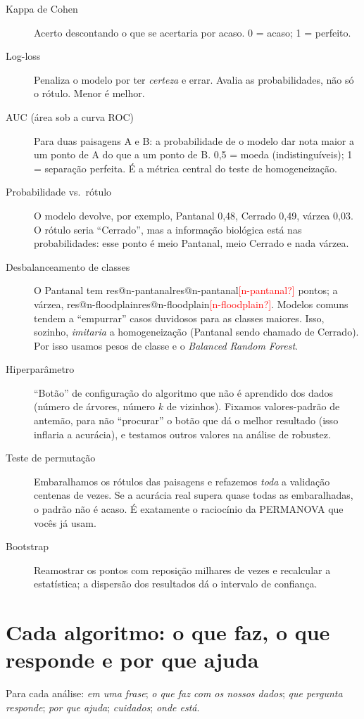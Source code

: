 \documentclass[11pt,a4paper]{article}
\makeatletter
\newcommand{\res}[1]{\ifcsname res@#1\endcsname\csname res@#1\endcsname\else\textcolor{red}{[#1?]}\fi}
\makeatother
\begin{document}
\begin{description}
\item[Kappa de Cohen] Acerto descontando o que se acertaria por acaso. 0 = acaso; 1 = perfeito.

\item[Log-loss] Penaliza o modelo por ter \emph{certeza} e errar. Avalia as probabilidades, não só o
rótulo. Menor é melhor.

\item[AUC (área sob a curva ROC)] Para duas paisagens A e B: a probabilidade de o modelo dar nota
maior a um ponto de A do que a um ponto de B. 0,5 = moeda (indistinguíveis); 1 = separação perfeita.
É a métrica central do teste de homogeneização.

\item[Probabilidade vs.\ rótulo] O modelo devolve, por exemplo, Pantanal 0,48, Cerrado 0,49,
várzea 0,03. O rótulo seria ``Cerrado'', mas a informação biológica está nas probabilidades: esse
ponto é meio Pantanal, meio Cerrado e nada várzea.

\item[Desbalanceamento de classes] O Pantanal tem \res{n-pantanal} pontos; a várzea, \res{n-floodplain}.
Modelos comuns tendem a ``empurrar'' casos duvidosos para as classes maiores. Isso, sozinho,
\emph{imitaria} a homogeneização (Pantanal sendo chamado de Cerrado). Por isso usamos pesos de
classe e o \emph{Balanced Random Forest}.

\item[Hiperparâmetro] ``Botão'' de configuração do algoritmo que não é aprendido dos dados (número
de árvores, número $k$ de vizinhos). Fixamos valores-padrão de antemão, para não ``procurar'' o
botão que dá o melhor resultado (isso inflaria a acurácia), e testamos outros valores na análise de
robustez.

\item[Teste de permutação] Embaralhamos os rótulos das paisagens e refazemos \emph{toda} a
validação centenas de vezes. Se a acurácia real supera quase todas as embaralhadas, o padrão não é
acaso. É exatamente o raciocínio da PERMANOVA que vocês já usam.

\item[Bootstrap] Reamostrar os pontos com reposição milhares de vezes e recalcular a estatística;
a dispersão dos resultados dá o intervalo de confiança.
\end{description}

\section{Cada algoritmo: o que faz, o que responde e por que ajuda}
Para cada análise: \emph{em uma frase}; \emph{o que faz com os nossos dados}; \emph{que
pergunta responde}; \emph{por que ajuda}; \emph{cuidados}; \emph{onde está}.
\end{document}
